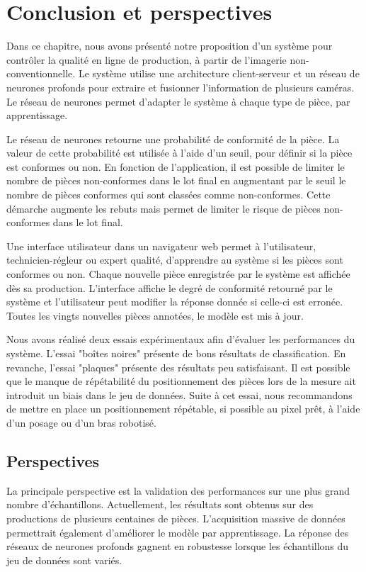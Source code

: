 \section{Conclusion et perspectives}
Dans ce chapitre, nous avons présenté notre proposition d'un système pour contrôler la qualité en ligne de production, à partir de l'imagerie non-conventionnelle.
Le système utilise une architecture client-serveur et un réseau de neurones profonds pour extraire et fusionner l'information de plusieurs caméras.
Le réseau de neurones permet d'adapter le système à chaque type de pièce, par apprentissage.

Le réseau de neurones retourne une probabilité de conformité de la pièce.
La valeur de cette probabilité est utilisée à l'aide d'un seuil, pour définir si la pièce est conformes ou non.
En fonction de l'application, il est possible de limiter le nombre de pièces non-conformes dans le lot final en augmentant par le seuil le nombre de pièces conformes qui sont classées comme non-conformes.
Cette démarche augmente les rebuts mais permet de limiter le risque de pièces non-conformes dans le lot final.

Une interface utilisateur dans un navigateur web permet à l'utilisateur, technicien-régleur ou expert qualité, d'apprendre au système si les pièces sont conformes ou non.
Chaque nouvelle pièce enregistrée par le système est affichée dès sa production.
L'interface affiche le degré de conformité retourné par le système et l'utilisateur peut modifier la réponse donnée si celle-ci est erronée.
Toutes les vingts nouvelles pièces annotées, le modèle est mis à jour.

Nous avons réalisé deux essais expérimentaux afin d'évaluer les performances du système.
L'essai "boîtes noires" présente de bons résultats de classification.
En revanche, l'essai "plaques" présente des résultats peu satisfaisant.
Il est possible que le manque de répétabilité du positionnement des pièces lors de la mesure ait introduit un biais dans le jeu de données.
Suite à cet essai, nous recommandons de mettre en place un positionnement répétable, si possible au pixel prêt, à l'aide d'un posage ou d'un bras robotisé.


\subsection{Perspectives}
La principale perspective est la validation des performances sur une plus grand nombre d'échantillons.
Actuellement, les résultats sont obtenus sur des productions de plusieurs centaines de pièces.
L'acquisition massive de données permettrait également d'améliorer le modèle par apprentissage.
La réponse des réseaux de neurones profonds gagnent en robustesse lorsque les échantillons du jeu de données sont variés.

